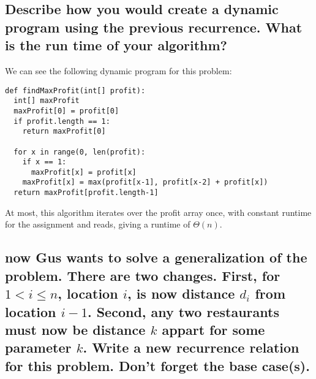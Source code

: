 \documentclass[titlepage]{article}\usepackage[]{graphicx}\usepackage[]{color}
\begin{document}
\subsection{Describe how you would create a dynamic program using the previous
recurrence. What is the run time of your algorithm?} 

We can see the following dynamic program for this problem:
\begin{lstlisting}
def findMaxProfit(int[] profit):
  int[] maxProfit
  maxProfit[0] = profit[0]
  if profit.length == 1:
	return maxProfit[0]

  for x in range(0, len(profit):
	if x == 1:
	  maxProfit[x] = profit[x]
	maxProfit[x] = max(profit[x-1], profit[x-2] + profit[x])
  return maxProfit[profit.length-1]
\end{lstlisting}

At most, this algorithm iterates over the profit array once, with constant
runtime for the assignment and reads, giving a runtime of $\Theta(n)$.

\subsection{now Gus wants to solve a generalization of the problem. There are
  two changes. First, for $1 < i \leq n$, location $i$, is now distance $d_i$
  from location $i-1$. Second, any two restaurants must now be distance $k$
  appart for some parameter $k$. Write a new recurrence relation for this
problem. Don't forget the base case(s).}
\end{document}

